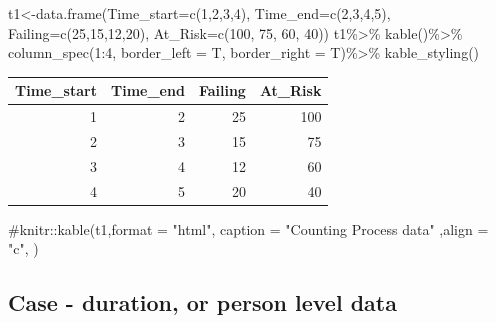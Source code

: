 \documentclass[
  letterpaper,
  DIV=11,
  numbers=noendperiod]{scrreprt}
\newenvironment{Shaded}{\begin{snugshade}}{\end{snugshade}}
\newcommand{\AttributeTok}[1]{\textcolor[rgb]{0.40,0.45,0.13}{#1}}
\newcommand{\CommentTok}[1]{\textcolor[rgb]{0.37,0.37,0.37}{#1}}
\newcommand{\DecValTok}[1]{\textcolor[rgb]{0.68,0.00,0.00}{#1}}
\newcommand{\FunctionTok}[1]{\textcolor[rgb]{0.28,0.35,0.67}{#1}}
\newcommand{\NormalTok}[1]{\textcolor[rgb]{0.00,0.23,0.31}{#1}}
\newcommand{\OtherTok}[1]{\textcolor[rgb]{0.00,0.23,0.31}{#1}}
\newcommand{\SpecialCharTok}[1]{\textcolor[rgb]{0.37,0.37,0.37}{#1}}
\begin{document}
\begin{Shaded}
\begin{Highlighting}[]
\NormalTok{t1}\OtherTok{\textless{}{-}}\FunctionTok{data.frame}\NormalTok{(}\AttributeTok{Time\_start=}\FunctionTok{c}\NormalTok{(}\DecValTok{1}\NormalTok{,}\DecValTok{2}\NormalTok{,}\DecValTok{3}\NormalTok{,}\DecValTok{4}\NormalTok{),}
               \AttributeTok{Time\_end=}\FunctionTok{c}\NormalTok{(}\DecValTok{2}\NormalTok{,}\DecValTok{3}\NormalTok{,}\DecValTok{4}\NormalTok{,}\DecValTok{5}\NormalTok{),}
               \AttributeTok{Failing=}\FunctionTok{c}\NormalTok{(}\DecValTok{25}\NormalTok{,}\DecValTok{15}\NormalTok{,}\DecValTok{12}\NormalTok{,}\DecValTok{20}\NormalTok{),}
               \AttributeTok{At\_Risk=}\FunctionTok{c}\NormalTok{(}\DecValTok{100}\NormalTok{, }\DecValTok{75}\NormalTok{, }\DecValTok{60}\NormalTok{, }\DecValTok{40}\NormalTok{))}
\NormalTok{t1}\SpecialCharTok{\%\textgreater{}\%}
  \FunctionTok{kable}\NormalTok{()}\SpecialCharTok{\%\textgreater{}\%}
  \FunctionTok{column\_spec}\NormalTok{(}\DecValTok{1}\SpecialCharTok{:}\DecValTok{4}\NormalTok{, }\AttributeTok{border\_left =}\NormalTok{ T, }\AttributeTok{border\_right =}\NormalTok{ T)}\SpecialCharTok{\%\textgreater{}\%}
  \FunctionTok{kable\_styling}\NormalTok{()}
\end{Highlighting}
\end{Shaded}

\begin{table}
\centering
\begin{tabular}{|>{}r|||>{}r|||>{}r|||>{}r|}
\hline
Time\_start & Time\_end & Failing & At\_Risk\\
\hline
1 & 2 & 25 & 100\\
\hline
2 & 3 & 15 & 75\\
\hline
3 & 4 & 12 & 60\\
\hline
4 & 5 & 20 & 40\\
\hline
\end{tabular}
\end{table}

\begin{Shaded}
\begin{Highlighting}[]
\CommentTok{\#knitr::kable(t1,format = "html", caption = "Counting Process data" ,align = "c", )}
\end{Highlighting}
\end{Shaded}

\hypertarget{case---duration-or-person-level-data}{%
\subsection{Case - duration, or person level
data}\label{case---duration-or-person-level-data}}
\end{document}

